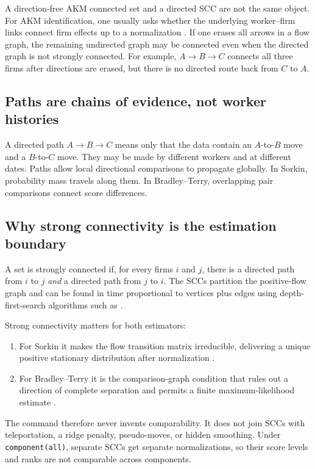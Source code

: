 \documentclass[11pt]{article}
\begin{document}
A direction-free AKM connected set and a directed SCC are not the same object.
For AKM identification, one usually asks whether the underlying worker--firm
links connect firm effects up to a normalization \citep{abowd2002computing}.
If one erases all arrows in a flow graph, the remaining undirected graph may be
connected even when the directed graph is not strongly connected. For example,
$A\rightarrow B\rightarrow C$ connects all three firms after directions are
erased, but there is no directed route back from $C$ to $A$.

\subsection{Paths are chains of evidence, not worker histories}

A directed path $A\rightarrow B\rightarrow C$ means only that the data contain
an $A$-to-$B$ move and a $B$-to-$C$ move. They may be made by different
workers and at different dates. Paths allow local directional comparisons to
propagate globally. In Sorkin, probability mass travels along them. In
Bradley--Terry, overlapping pair comparisons connect score differences.

\subsection{Why strong connectivity is the estimation boundary}
\label{subsec:scc}

A set is strongly connected if, for every firms $i$ and $j$, there is a
directed path from $i$ to $j$ \emph{and} a directed path from $j$ to $i$.
The SCCs partition the positive-flow graph and can be found in time
proportional to vertices plus edges using depth-first-search algorithms such as
\citet{tarjan1972depth}.

Strong connectivity matters for both estimators:
\begin{enumerate}
  \item For Sorkin it makes the flow transition matrix irreducible, delivering
  a unique positive stationary distribution after normalization
  \citep{levin2017markov}.
  \item For Bradley--Terry it is the comparison-graph condition that rules out
  a direction of complete separation and permits a finite maximum-likelihood
  estimate \citep{ford1957solution}.
\end{enumerate}
The command therefore never invents comparability. It does not join SCCs with
teleportation, a ridge penalty, pseudo-moves, or hidden smoothing. Under
\texttt{component(all)}, separate SCCs get separate normalizations, so their
score levels and ranks are not comparable across components.
\end{document}
